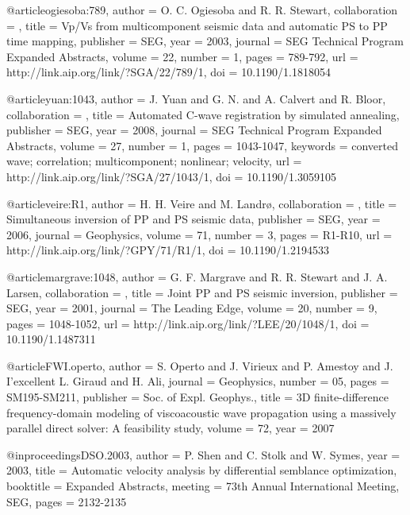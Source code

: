 @article{ogiesoba:789,
author = {O. C. Ogiesoba and R. R. Stewart},
collaboration = {},
title = {Vp/{V}s from multicomponent seismic data and automatic {PS}
                  to {PP} time mapping},
publisher = {SEG},
year = {2003},
journal = {SEG Technical Program Expanded Abstracts},
volume = {22},
number = {1},
pages = {789-792},
url = {http://link.aip.org/link/?SGA/22/789/1},
doi = {10.1190/1.1818054}
}





@article{yuan:1043,
author = {J. Yuan and G. N. and A. Calvert and
                  R. Bloor},
collaboration = {},
title = {Automated {C}-wave registration by simulated annealing},
publisher = {SEG},
year = {2008},
journal = {SEG Technical Program Expanded Abstracts},
volume = {27},
number = {1},
pages = {1043-1047},
keywords = {converted wave; correlation; multicomponent; nonlinear;
                  velocity},
url = {http://link.aip.org/link/?SGA/27/1043/1},
doi = {10.1190/1.3059105}
}

@article{veire:R1,
author = {H. H. Veire and M. Landr\o},
collaboration = {},
title = {Simultaneous inversion of {PP} and {PS} seismic data},
publisher = {SEG},
year = {2006},
journal = {Geophysics},
volume = {71},
number = {3},
pages = {R1-R10},
url = {http://link.aip.org/link/?GPY/71/R1/1},
doi = {10.1190/1.2194533}
}

@article{margrave:1048,
author = {G. F. Margrave and R. R. Stewart and J. A. Larsen},
collaboration = {},
title = {Joint {PP} and {PS} seismic inversion},
publisher = {SEG},
year = {2001},
journal = {The Leading Edge},
volume = {20},
number = {9},
pages = {1048-1052},
url = {http://link.aip.org/link/?LEE/20/1048/1},
doi = {10.1190/1.1487311}
}







@article{FWI.operto,
  author = { S. Operto and J. Virieux and P. Amestoy and J.
I'excellent L. Giraud and H. Ali},
  journal = {Geophysics},
  number = {05},
  pages = {SM195-SM211},
  publisher = {Soc. of Expl. Geophys.},
  title = { 3{D} finite-difference frequency-domain modeling of
viscoacoustic wave propagation using a massively parallel direct
solver: A feasibility study},
  volume = {72},
  year = {2007}}

@inproceedings{DSO.2003,
  author    = {P. Shen and C. Stolk and W. Symes},
  year      = {2003},
  title     = {Automatic velocity analysis by differential semblance
optimization},
  booktitle = {Expanded Abstracts},
  meeting   = {73th Annual International Meeting, SEG},
  pages     = {2132-2135}
}

